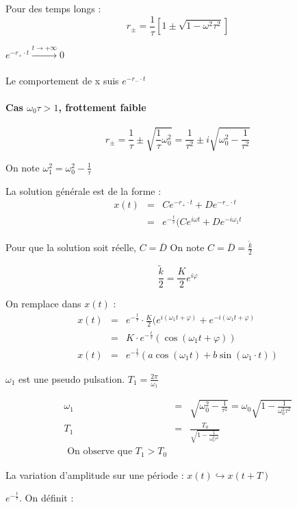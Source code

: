 	Pour des temps longs :
	\[r_{\pm} = \frac{1}{\tau}[1\pm\sqrt{1-\omega^2 \tau^2}]\]

	$e^{-r_+ \cdot t} \xrightarrow[]{t \to +\infty} 0$

	Le comportement de x suis $e^{-r_- \cdot t}$

	\paragraph{Cas $\omega_0 \tau > 1$, frottement faible}
	\[r_{\pm} = \frac{1}{\tau} \pm \sqrt{\frac{1}{\tau}\omega_0^2} = \frac{1}{\tau^2} \pm i \sqrt{\omega_0^2 - \frac{1}{\tau^2}}\]

	On note $\omega_1^2 = \omega_0^2 - \frac{1}{\tau}$

	La solution générale est de la forme : 
	\[\begin{array}{rcl}
			x(t) &=& Ce^{-r_+ \cdot t} + De^{-r_- \cdot t} \\
					   &=& e^{-\frac{t}{\tau}} (Ce^{i\omega t} + De^{-i\omega_1 t} \end{array}\]

	Pour que la solution soit réelle, $C = \overline{D}$
On note $C = \overline{D} = \frac{\tilde{k}}{2}$

\[\frac{\tilde{k}}{2} = \frac{K}{2}e^{i\varphi}\]

On remplace dans $x(t)$ :
\[\begin{array}{rclr}
		x(t) &=& e^{-\frac{t}{\tau}} \cdot \frac{K}{2} (e^{i(\omega_1 t + \varphi)} + e^{-i(\omega_1 t + \varphi)} \\
				   &=& K \cdot e^{-\frac{t}{\tau}}(\cos(\omega_1 t + \varphi)) \\
				   x(t) &=& e^{-\frac{t}{\tau}}(a\cos(\omega_1 t) + b \sin(\omega_1 \cdot t))
		\end{array}\]

	$\omega_1$ est une pseudo pulsation.
	$T_1 = \frac{2\pi}{\omega_1}$

	\[\begin{array}{rcl}
			\omega_1 &=& \sqrt{\omega_0^2 - \frac{1}{\tau^2}} = \omega_0 \sqrt{1-\frac{1}{\omega_0^2 \tau^2}} \\
			T_1 &=& \frac{T_0}{\sqrt{1 - \frac{1}{\omega_0^2  \tau^2}}} \\
	\text{ On observe que  } T_1 > T_0\end{array}\]

	La variation d'amplitude sur une période : $x(t) \hookrightarrow x(t + T)$

	$e^{-\frac{t}{\tau}}$. On définit :


